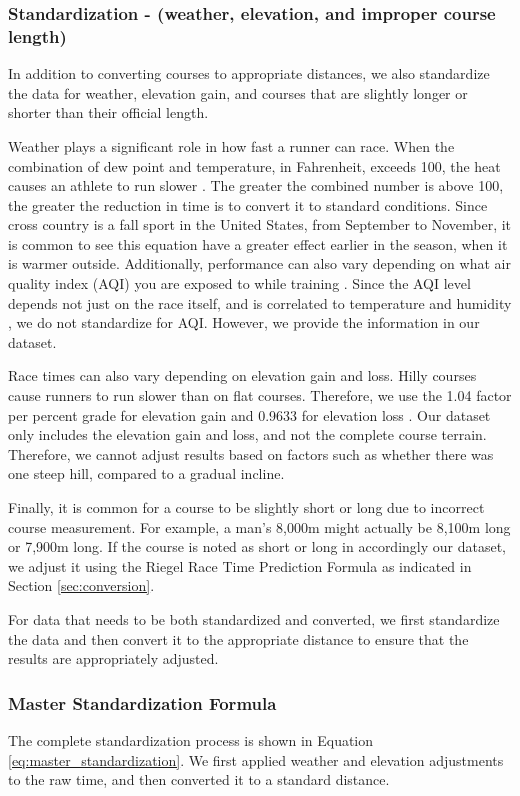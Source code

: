 \documentclass[suppldata]{interact}
\theoremstyle{plain}%
\theoremstyle{definition}
\theoremstyle{remark}
\begin{document}
\subsubsection{Standardization - (weather, elevation, and improper course length)}
In addition to converting courses to appropriate distances, we also standardize the data for weather, elevation gain, and courses that are slightly longer or shorter than their official length. 

Weather plays a significant role in how fast a runner can race. When the combination of dew point and temperature, in Fahrenheit, exceeds 100, the heat causes an athlete to run slower \cite{MaxPerformanceRunning}. The greater the combined number is above 100, the greater the reduction in time is to convert it to standard conditions. Since cross country is a fall sport in the United States, from September to November, it is common to see this equation have a greater effect earlier in the season, when it is warmer outside. Additionally, performance can also vary depending on what air quality index (AQI) you are exposed to while training \cite{cusick2023impact}. Since the AQI level depends not just on the race itself, and is correlated to temperature and humidity \cite{zender2024effect}, we do not standardize for AQI. However, we provide the information in our dataset.

Race times can also vary depending on elevation gain and loss. Hilly courses cause runners to run slower than on flat courses. Therefore, we use the 1.04 factor per percent grade for elevation gain and 0.9633 for elevation loss \cite{maurer2018race}. Our dataset only includes the elevation gain and loss, and not the complete course terrain. Therefore, we cannot adjust results based on factors such as whether there was one steep hill, compared to a gradual incline.

Finally, it is common for a course to be slightly short or long due to incorrect course measurement. For example, a man's 8,000m might actually be 8,100m long or 7,900m long. If the course is noted as short or long in accordingly our dataset, we adjust it using the Riegel Race Time Prediction Formula \cite{riegel1981athletic} as indicated in Section \ref{sec:conversion}.

For data that needs to be both standardized and converted, we first standardize the data and then convert it to the appropriate distance to ensure that the results are appropriately adjusted.

\subsubsection{Master Standardization Formula}
The complete standardization process is shown in Equation \ref{eq:master_standardization}. We first applied weather and elevation adjustments to the raw time, and then converted it to a standard distance.
\end{document}
